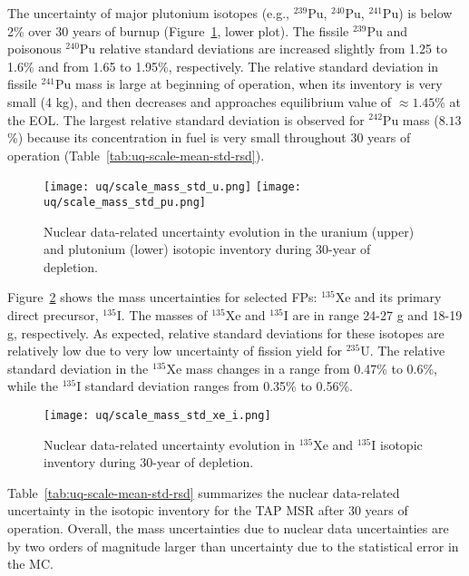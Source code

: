 The uncertainty of major plutonium isotopes (e.g., $^{239}$Pu, $^{240}$Pu, 
$^{241}$Pu) is below 2\% over 30 years of burnup 
(Figure~\ref{fig:uq-scale-u-pu}, lower plot). The fissile $^{239}$Pu and 
poisonous $^{240}$Pu relative standard deviations are increased slightly from 
1.25 to 1.6\% and from 1.65 to 1.95\%, respectively. The relative standard 
deviation in fissile $^{241}$Pu mass is large at beginning of operation, when 
its inventory is very small (4 kg), and then decreases and approaches 
equilibrium value of $\approx1.45$\% at the \gls{EOL}. The largest relative 
standard deviation is observed for $^{242}$Pu mass ($8.13$\%) because its 
concentration in fuel is very small throughout 30 years of operation 
(Table~\ref{tab:uq-scale-mean-std-rsd}).

\begin{figure}[hbp!] %
	\centering
	\texttt{[image: uq/scale\_mass\_std\_u.png]}
		\vspace{-12mm}
	\hspace{0.0mm}
	\texttt{[image: uq/scale\_mass\_std\_pu.png]}
		\vspace{+8mm}
	\caption{Nuclear data-related uncertainty evolution in the uranium (upper) 
	and plutonium (lower) isotopic inventory during 30-year of depletion.}
	\label{fig:uq-scale-u-pu}
\end{figure}

Figure~\ref{fig:uq-scale-xe-i} shows the mass uncertainties for selected 
\glspl{FP}: $^{135}$Xe and its primary direct precursor, $^{135}$I. The masses 
of $^{135}$Xe and $^{135}$I are in range 24-27 g and 18-19 g, respectively. As 
expected, relative standard deviations for these isotopes are relatively low 
due to very low uncertainty of fission yield for $^{235}$U. The relative 
standard deviation in the $^{135}$Xe mass changes in a range from 0.47\% to 
0.6\%, while the $^{135}$I standard deviation ranges from 0.35\% to 0.56\%.
\begin{figure}[hbp!] %
	\centering
	\texttt{[image: uq/scale\_mass\_std\_xe\_i.png]}
	\caption{Nuclear data-related uncertainty evolution in $^{135}$Xe and 
	$^{135}$I isotopic inventory during 30-year of depletion.}
	\label{fig:uq-scale-xe-i}
\end{figure}

Table~\ref{tab:uq-scale-mean-std-rsd} summarizes the nuclear data-related 
uncertainty in the isotopic inventory for the \gls{TAP} \gls{MSR} after 30 
years of operation. Overall, the mass uncertainties due to nuclear data 
uncertainties are by two orders of magnitude larger than uncertainty due to 
the statistical error in the \gls{MC}.  


